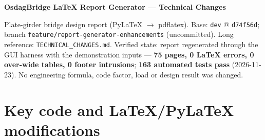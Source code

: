 \documentclass[10pt,a4paper]{article}
\newcommand{\f}[1]{\texttt{#1}}
\begin{document}
{\Large\bfseries OsdagBridge LaTeX Report Generator --- Technical Changes}\par
\vspace{2pt}
{\small\raggedright Plate-girder bridge design report (PyLaTeX $\to$ pdflatex). Base: \f{dev} @ \f{d74f56d}; branch \f{feature/report-generator-enhancements} (uncommitted). Long reference: \f{TECHNICAL\_CHANGES.md}.
Verified state: report regenerated through the GUI harness with the demonstration inputs --- \textbf{75 pages, 0 LaTeX errors, 0 over-wide tables, 0 footer intrusions}; \textbf{163 automated tests pass} (2026-11-23). No engineering formula, code factor, load or design result was changed.\par}

\section{Key code and LaTeX/PyLaTeX modifications}
\end{document}
